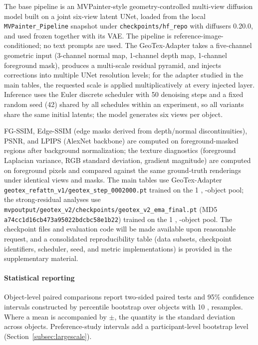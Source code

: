 \documentclass[times,twocolumn,final]{elsarticle}
\providecommand{\DIFadd}[1]{{\protect\color{blue} \sf #1}} %
\providecommand{\DIFaddend}{} %
\DeclareRobustCommand{\DIFaddend}{\DIFOaddend \let\includegraphics\DIFOincludegraphics} %
\begin{document}
\DIFadd{The base pipeline is an MVPainter-style geometry-controlled multi-view diffusion model built on a joint six-view latent UNet, loaded from the local \texttt{MVPainter\_Pipeline} snapshot under \texttt{checkpoints/hf\_repo} with diffusers 0.20.0, and used frozen together with its VAE. The pipeline is reference-image-conditioned; no text prompts are used. The GeoTex-Adapter takes a five-channel geometric input (3-channel normal map, 1-channel depth map, 1-channel foreground mask), produces a multi-scale residual pyramid, and injects corrections into multiple UNet resolution levels; for the adapter studied in the main tables, the requested scale is applied multiplicatively at every injected layer. Inference uses the Euler discrete scheduler with 50 denoising steps and a fixed random seed (42) shared by all schedules within an experiment, so all variants share the same initial latents; the model generates six views per object.
}

\DIFadd{FG-SSIM, Edge-SSIM (edge masks derived from depth/normal discontinuities), PSNR, and LPIPS (AlexNet backbone) are computed on foreground-masked regions after background normalization; the texture diagnostics (foreground Laplacian variance, RGB standard deviation, gradient magnitude) are computed on foreground pixels and compared against the same ground-truth renderings under identical views and masks. The main tables use GeoTex-Adapter \texttt{geotex\_refattn\_v1/geotex\_step\_0002000.pt} trained on the 1}{\DIFadd{,}}\DIFadd{118-object pool; the strong-residual analyses use \texttt{mvpoutput/geotex\_v2/checkpoints/geotex\_v2\_ema\_final.pt} (MD5 \texttt{a74cc1d16cb473a95022bdcbc58e1b22}) trained on the 1}{\DIFadd{,}}\DIFadd{706-object pool. The checkpoint files and evaluation code will be made available upon reasonable request, and a consolidated reproducibility table (data subsets, checkpoint identifiers, scheduler, seed, and metric implementations) is provided in the supplementary material.
}

\paragraph{\DIFadd{Statistical reporting}}
\DIFadd{Object-level paired comparisons report two-sided paired tests and 95\% confidence intervals constructed by percentile bootstrap over objects with 10}{\DIFadd{,}}\DIFadd{000 resamples. Where a mean is accompanied by $\pm$, the quantity is the standard deviation across objects. Preference-study intervals add a participant-level bootstrap level (Section~\ref{subsec:largescale})}\DIFaddend .
\end{document}
